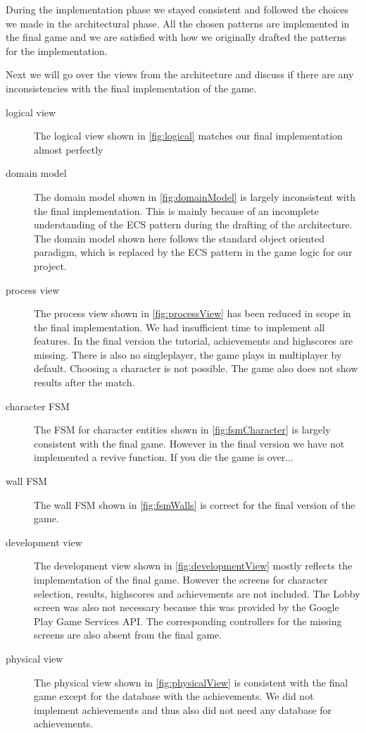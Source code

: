 During the implementation phase we stayed consistent and followed the choices we made in the architectural phase. All the chosen patterns are implemented in the final game and we are satisfied with how we originally drafted the patterns for the implementation.

Next we will go over the views from the architecture and discuss if there are any inconsistencies with the final implementation of the game.

\begin{description}
	\item[logical view] The logical view shown in \autoref{fig:logical} matches our final implementation almost perfectly
	\item[domain model] The domain model shown in \autoref{fig:domainModel} is largely inconsistent with the final implementation. This is mainly because of an incomplete understanding of the ECS pattern during the drafting of the architecture. The domain model shown here follows the standard object oriented paradigm, which is replaced by the ECS pattern in the game logic for our project.
	\item[process view] The process view shown in \autoref{fig:processView} has been reduced in scope in the final implementation. We had insufficient time to implement all features. In the final version the tutorial, achievements and highscores are missing. There is also no singleplayer, the game plays in multiplayer by default. Choosing a character is not possible. The game also does not show results after the match.
	\item[character FSM] The FSM for character entities shown in \autoref{fig:fsmCharacter} is largely consistent with the final game. However in the final version we have not implemented a revive function. If you die the game is over...
	\item[wall FSM] The wall FSM  shown in \autoref{fig:fsmWalls} is correct for the final version of the game.
	\item[development view] The development view shown in \autoref{fig:developmentView} mostly reflects the implementation of the final game. However the screens for character selection, results, highscores and achievements are not included. The Lobby screen was also not necessary because this was provided by the Google Play Game Services API. The corresponding controllers for the missing screens are also absent from the final game.
	\item[physical view] The physical view shown in \autoref{fig:physicalView} is consistent with the final game except for the database with the achievements. We did not implement achievements and thus also did not need any database for achievements.	
\end{description}

